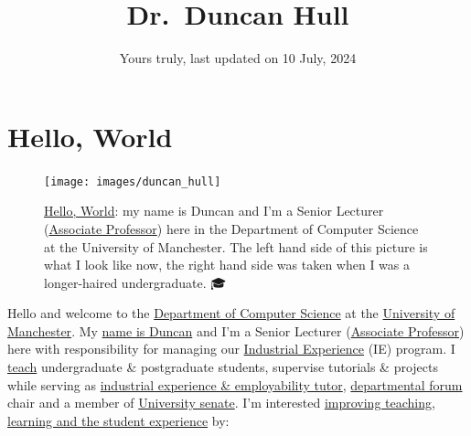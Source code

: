 \documentclass[
  12pt,
]{book}
\title{Dr.~Duncan Hull}
\author{Yours truly, last updated on 10 July, 2024}
\date{}
\begin{document}
\maketitle

{
\setcounter{tocdepth}{1}
\tableofcontents
}
\hypertarget{hello-world}{%
\chapter*{Hello, World}\label{hello-world}}

\begin{figure}

{\centering \texttt{[image: images/duncan\_hull]} 

}

\caption{\href{https://en.wikipedia.org/wiki/Hello,_World}{Hello, World}: my name is Duncan and I'm a Senior Lecturer (\href{https://en.wikipedia.org/wiki/Associate_professor}{Associate Professor}) here in the Department of Computer Science at the University of Manchester. The left hand side of this picture is what I look like now, the right hand side was taken when I was a longer-haired undergraduate. 🎓}\label{fig:unsplashed-fig}
\end{figure}



Hello and welcome to the \href{https://www.cs.manchester.ac.uk/}{Department of Computer Science} at the \href{https://www.manchester.ac.uk}{University of Manchester}. My \href{https://en.wikipedia.org/wiki/Duncan_(given_name)}{name is Duncan} and I'm a Senior Lecturer (\href{https://en.wikipedia.org/wiki/Associate_professor}{Associate Professor}) here with responsibility for managing our \href{https://www.cs.manchester.ac.uk/study/undergraduate/industrial-experience/}{Industrial Experience} (IE) program. I \href{https://personalpages.manchester.ac.uk/staff/duncan.hull/teaching}{teach} undergraduate \& postgraduate students, supervise tutorials \& projects while serving as \href{http://studentnet.cs.manchester.ac.uk/employment/placement/}{industrial experience \& employability tutor}, \href{https://bit.ly/cs-departmental-forum}{departmental forum} chair and a member of \href{https://www.manchester.ac.uk/discover/governance/structure/senate/}{University senate}. I'm interested \href{https://personalpages.manchester.ac.uk/staff/duncan.hull/research.html}{improving teaching, learning and the student experience} by:
\end{document}
